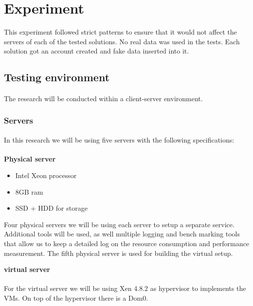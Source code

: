 \section{Experiment}
\paragraph{}
This experiment followed strict patterns to ensure that it would not affect the servers of each of the tested solutions. No real data was used in the tests. Each solution got an account created and fake data inserted into it.


\subsection{Testing environment}
\paragraph{}
The research will be conducted within a client-server environment.

\subsubsection{Servers}
\paragraph{}
In this research we will be using five servers with the following specifications:\\~\\
\textbf{Physical server}
\begin{itemize}
	\item Intel Xeon processor
	\item 8GB ram
	\item SSD + HDD for storage
\end{itemize}

 Four physical servers we will be using each server to setup a separate service. Additional tools will be used, as well multiple logging and bench marking tools that allow us to keep a detailed log on the resource consumption and performance measurement. The fifth physical server is used for building the virtual setup.
 

\textbf{virtual server}
\paragraph{}
For the virtual server we will be using Xen 4.8.2 as hypervisor to implements the VMs. On top of the hypervisor there is a Dom0.


